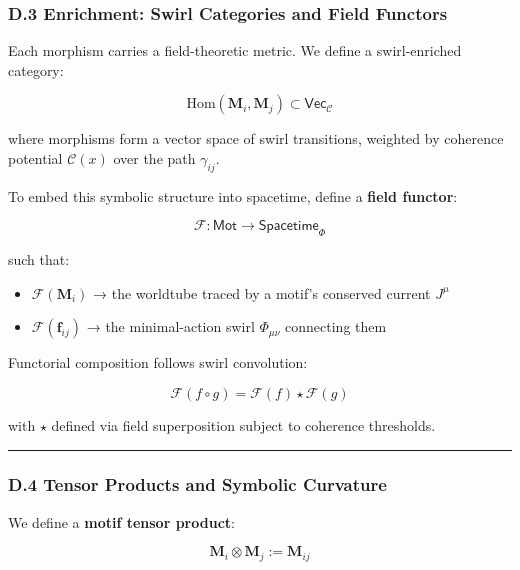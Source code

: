 \documentclass[
  11pt,
]{article}
\providecommand{\tightlist}{%
  \setlength{\itemsep}{0pt}\setlength{\parskip}{0pt}}
\begin{document}
\subsubsection{\texorpdfstring{\textbf{D.3 Enrichment: Swirl Categories
and Field
Functors}}{D.3 Enrichment: Swirl Categories and Field Functors}}\label{d.3-enrichment-swirl-categories-and-field-functors}

Each morphism carries a field-theoretic metric. We define a
swirl-enriched category:

\[
\text{Hom}(\mathbf{M}_i, \mathbf{M}_j) \subset \mathsf{Vec}_{\mathcal{C}}
\]

where morphisms form a vector space of swirl transitions, weighted by
coherence potential \(\mathcal{C}(x)\) over the path \(\gamma_{ij}\).

To embed this symbolic structure into spacetime, define a \textbf{field
functor}:

\[
\mathcal{F}: \mathsf{Mot} \rightarrow \mathsf{Spacetime}_\Phi
\]

such that:

\begin{itemize}
\tightlist
\item
  \(\mathcal{F}(\mathbf{M}_i)\) → the worldtube traced by a motif's
  conserved current \(J^\mu\)
\item
  \(\mathcal{F}(\mathbf{f}_{ij})\) → the minimal-action swirl
  \(\Phi_{\mu\nu}\) connecting them
\end{itemize}

Functorial composition follows swirl convolution:

\[
\mathcal{F}(f \circ g) = \mathcal{F}(f) \star \mathcal{F}(g)
\]

with \(\star\) defined via field superposition subject to coherence
thresholds.

\begin{center}\rule{0.5\linewidth}{0.5pt}\end{center}

\subsubsection{\texorpdfstring{\textbf{D.4 Tensor Products and Symbolic
Curvature}}{D.4 Tensor Products and Symbolic Curvature}}\label{d.4-tensor-products-and-symbolic-curvature}

We define a \textbf{motif tensor product}:

\[
\mathbf{M}_i \otimes \mathbf{M}_j := \mathbf{M}_{ij}
\]
\end{document}
